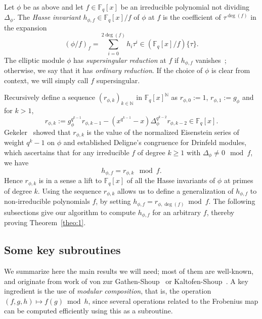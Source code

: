 \documentclass[12pt]{article}
\theoremstyle{plain}
\theoremstyle{definition}
\newcommand{\ang}[1]{\{#1\}}
\def\F{\ensuremath{\mathbb{F}}}
\newcommand{\D}{\Delta}
\newcommand{\ph}{(\phi/f)}
\begin{document}
Let $\phi$ be as above and let $f \in \F_q[x]$ be an irreducible 
polynomial not dividing $\Delta_\phi$. The {\em Hasse invariant} $h_{\phi,f}
\in \F_q[x]/f$ of $\phi$ at $f$ is the coefficient of $\tau^{\deg(f)}$
in the expansion $$\ph_f = \sum_{i=0}^{2\deg(f)} h_i \tau^i \in
(\F_{q}[x]/f)\ang{\tau}.$$
The elliptic module $\phi$ has {\em supersingular reduction} at $f$ if
$h_{\phi,f}$ vanishes~\cite{gos}; otherwise, we say that it has {\em
  ordinary reduction}. If the choice of $\phi$ is clear from context,
we will simply call $f$ supersingular.

Recursively define a sequence $(r_{\phi,k})_{k \in \mathbb{N}}$ in
$\F_q[x]^\mathbb{N}$ as $r_{\phi,0}:=1$, $r_{\phi,1}:=g_\phi$ and for
$k>1$,
\begin{equation}\label{eisenstein_recurrence}
r_{\phi,k} := g_\phi^{q^{k-1}}r_{\phi,k-1} - (x^{q^{k-1}}-x)\D_\phi^{q^{k-2}} r_{\phi,k-2} \in \F_q[x].
\end{equation}
Gekeler~\cite[Eq 3.6, Prop 3.7]{gek} showed that $r_{\phi,k}$ is
the value of the normalized Eisenstein series of weight $q^{k}-1$ on
$\phi$ and established Deligne's congruence for Drinfeld modules,
which ascertains that for any irreducible $f$ of degree $k \geq 1$ with
$\Delta_\phi \neq 0 \mod f$, we have
\begin{equation}\label{deligne_congruence}
 h_{\phi,f} = r_{\phi,k} \mod f.
\end{equation}
Hence $r_{\phi,k}$ is in a sense a lift to $\F_q[x]$ of all the Hasse
invariants of $\phi$ at primes of degree $k$. Using the sequence
$r_{\phi,k}$ allows us to define a generalization of $h_{\phi,f}$ to
non-irreducible polynomials $f$, by setting $h_{\phi,f} =
r_{\phi,\deg(f)} \bmod f$.  The following subsections give our
algorithm to compute $h_{\phi, f}$ for an arbitrary $f$, thereby
proving Theorem~\ref{theo:1}.


\subsection{Some key subroutines}

 We summarize here the main results we will need;
most of them are well-known, and originate from work of von zur
Gathen-Shoup~\cite{gs} or Kaltofen-Shoup~\cite{ks}. A key ingredient
is the use of {\em modular composition}, that is, the operation
$(f,g,h)\mapsto f(g) \bmod h$, since several operations related to the
Frobenius map can be computed efficiently using this as a subroutine.
\end{document}
